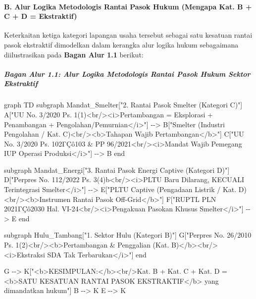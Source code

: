 \documentclass[
]{article}
\newenvironment{Shaded}{}{}
\newcommand{\NormalTok}[1]{#1}
\begin{document}
\paragraph{B. Alur Logika Metodologis Rantai Pasok Hukum (Mengapa Kat. B
+ C + D =
Ekstraktif)}\label{b.-alur-logika-metodologis-rantai-pasok-hukum-mengapa-kat.-b-c-d-ekstraktif}

Keterkaitan ketiga kategori lapangan usaha tersebut sebagai satu
kesatuan rantai pasok ekstraktif dimodelkan dalam kerangka alur logika
hukum sebagaimana diilustrasikan pada \textbf{Bagan Alur 1.1} berikut:

\subparagraph{Bagan Alur 1.1: Alur Logika Metodologis Rantai Pasok Hukum
Sektor
Ekstraktif}\label{bagan-alur-1.1-alur-logika-metodologis-rantai-pasok-hukum-sektor-ekstraktif}

\begin{Shaded}
\begin{Highlighting}[]
\NormalTok{graph TD}
\NormalTok{    subgraph Mandat\_Smelter["2. Rantai Pasok Smelter (Kategori C)"]}
\NormalTok{        A["UU No. 3/2020 Ps. 1(1)\textless{}br/\textgreater{}\textless{}i\textgreater{}Pertambangan = Eksplorasi + Penambangan + Pengolahan/Pemurnian\textless{}/i\textgreater{}"] {-}{-}\textgreater{} B["Smelter (Industri Pengolahan / Kat. C)\textless{}br/\textgreater{}\textless{}b\textgreater{}Tahapan Wajib Pertambangan\textless{}/b\textgreater{}"]}
\NormalTok{        C["UU No. 3/2020 Ps. 102ΓÇô103 \& PP 96/2021\textless{}br/\textgreater{}\textless{}i\textgreater{}Mandat Wajib Pemegang IUP Operasi Produksi\textless{}/i\textgreater{}"] {-}{-}\textgreater{} B}
\NormalTok{    end}

\NormalTok{    subgraph Mandat\_Energi["3. Rantai Pasok Energi Captive (Kategori D)"]}
\NormalTok{        D["Perpres No. 112/2022 Ps. 3(4)b\textless{}br/\textgreater{}\textless{}i\textgreater{}PLTU Baru Dilarang, KECUALI Terintegrasi Smelter\textless{}/i\textgreater{}"] {-}{-}\textgreater{} E["PLTU Captive (Pengadaan Listrik / Kat. D)\textless{}br/\textgreater{}\textless{}b\textgreater{}Instrumen Rantai Pasok Off{-}Grid\textless{}/b\textgreater{}"]}
\NormalTok{        F["RUPTL PLN 2021ΓÇô2030 Hal. VI{-}24\textless{}br/\textgreater{}\textless{}i\textgreater{}Pengakuan Pasokan Khusus Smelter\textless{}/i\textgreater{}"] {-}{-}\textgreater{} E}
\NormalTok{    end}

\NormalTok{    subgraph Hulu\_Tambang["1. Sektor Hulu (Kategori B)"]}
\NormalTok{        G["Perpres No. 26/2010 Ps. 1(2)\textless{}br/\textgreater{}\textless{}b\textgreater{}Pertambangan \& Penggalian (Kat. B)\textless{}/b\textgreater{}\textless{}br/\textgreater{}\textless{}i\textgreater{}Ekstraksi SDA Tak Terbarukan\textless{}/i\textgreater{}"]}
\NormalTok{    end}

\NormalTok{    G {-}{-}\textgreater{} K["\textless{}b\textgreater{}KESIMPULAN:\textless{}/b\textgreater{}\textless{}br/\textgreater{}Kat. B + Kat. C + Kat. D = \textless{}b\textgreater{}SATU KESATUAN RANTAI PASOK EKSTRAKTIF\textless{}/b\textgreater{} yang dimandatkan hukum"]}
\NormalTok{    B {-}{-}\textgreater{} K}
\NormalTok{    E {-}{-}\textgreater{} K}
\end{Highlighting}
\end{Shaded}
\end{document}
